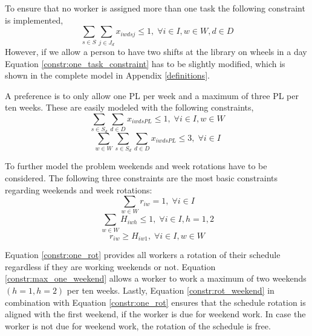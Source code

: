 To ensure that no worker is assigned more than one task the following constraint is implemented,
\begin{equation} \label{constr:one_task_constraint}
\sum_{s\in S}\sum_{j\in J_d} x_{iwdsj} \leq 1, \; \forall i\in I, w \in W, d\in D
\end{equation}
However, if we allow a person to have two shifts at the library on wheels in a day Equation \ref{constr:one_task_constraint} has to be slightly modified, which is shown in the complete model in Appendix \ref{definitions}.

A preference is to only allow one PL per week and a maximum of three PL per ten weeks. These are easily modeled with the following constraints,
\begin{equation} \label{constr:one_PL}
\sum_{s \in S_d}\sum_{d \in D} x_{iwdsPL} \leq 1, \; \forall i\in I, w \in W
\end{equation}
\begin{equation} \label{constr:three_PL}
\sum_{w \in W}\sum_{s \in S_d}\sum_{d \in D} x_{iwdsPL} \leq 3, \; \forall i\in I
\end{equation}

To further model the problem weekends and week rotations have to be considered. The following three constraints are the most basic constraints regarding weekends and week rotations:
\begin{equation} \label{constr:one_rot}
\sum_{w \in W} r_{iw} = 1, \; \forall i\in I
\end{equation}
\begin{equation} \label{constr:max_one_weekend}
\sum_{w \in W} H_{iwh} \leq 1, \; \forall i\in I, h = 1,2
\end{equation}
\begin{equation} \label{constr:rot_weekend}
r_{iw} \geq H_{iw1}, \; \forall i\in I, w \in W
\end{equation}

Equation \ref{constr:one_rot} provides all workers a rotation of their schedule regardless if they are working weekends or not. Equation \ref{constr:max_one_weekend} allows a worker to work a maximum of two weekends $(h = 1, h = 2)$ per ten weeks. Lastly, Equation \ref{constr:rot_weekend} in combination with Equation \ref{constr:one_rot} ensures that the schedule rotation is aligned with the first weekend, if the worker is due for weekend work. In case the worker is not due for weekend work, the rotation of the schedule is free.

